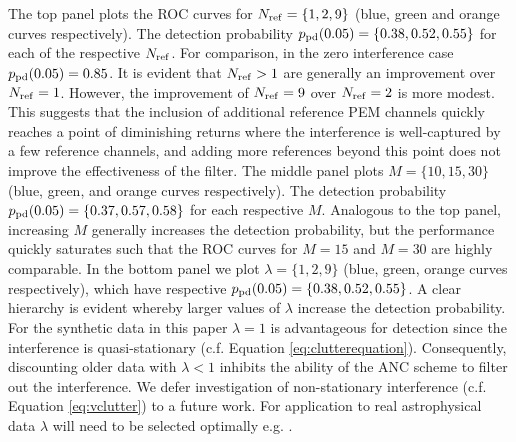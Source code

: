 \documentclass[pra,superscriptaddress,reprint,amsmath,amssymb,nofootinbib]{revtex4-2}
\begin{document}
The top panel plots the ROC curves for $N_{\rm ref} = \{ 1,2,9 \}$ (blue, green and orange curves respectively). The detection probability $p_{\rm pd} (0.05) = \{ 0.38,0.52,0.55 \}$ for each of the respective $N_{\rm ref}$. For comparison, in the zero interference case $p_{\rm pd}(0.05) = 0.85$. It is evident that $N_{\rm ref} > 1$ are generally an improvement over $N_{\rm ref} = 1$. However, the improvement of $N_{\rm ref} =9$ over $N_{\rm ref} =2$ is more modest. This suggests that the inclusion of additional reference PEM channels quickly reaches a point of diminishing returns where the interference is well-captured by a few reference channels, and adding more references beyond this point does not improve the effectiveness of the filter. The middle panel plots $M = \{10,15,30\}$ (blue, green, and orange curves respectively). The detection probability $p_{\rm pd} (0.05) = \{0.37, 0.57, 0.58\}$ for each respective $M$. Analogous to the top panel, increasing $M$ generally increases the detection probability, but the performance quickly saturates such that the ROC curves for $M=15$ and $M=30$ are highly comparable. In the bottom panel we plot $\lambda = \{1,2,9\}$ (blue, green, orange curves respectively), which have respective $p_{\rm pd} (0.05) = \{0.38, 0.52, 0.55\}$. A clear hierarchy is evident whereby larger values of $\lambda$ increase the detection probability. For the synthetic data in this paper $\lambda=1$ is advantageous for detection since the interference is quasi-stationary (c.f. Equation \ref{eq:clutterequation}). Consequently, discounting older data with $\lambda < 1$ inhibits the ability of the ANC scheme to filter out the interference. We defer investigation of non-stationary interference (c.f. Equation \ref{eq:vclutter}) to a future work. For application to real astrophysical data $\lambda$ will need to be selected optimally e.g. \citep{6349749}. 




%
%
%
%
%
%
%
%
%
%
%
%
%
%
%
%
\end{document}
